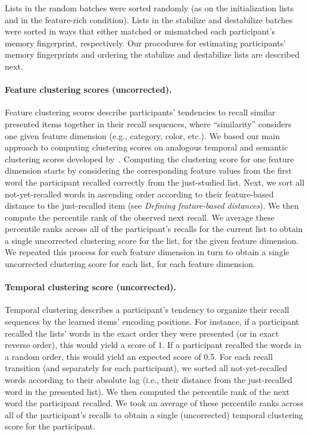 \documentclass[11pt]{article}
\begin{document}
Lists in the random batches were sorted randomly (as on the initialization
lists and in the feature-rich condition). Lists in the stabilize and
destabilize batches were sorted in ways that either matched or mismatched each
participant's memory fingerprint, respectively. Our procedures for estimating
participants' memory fingerprints and ordering the stabilize and destabilize
lists are described next.

\paragraph*{Feature clustering scores (uncorrected).}

Feature clustering scores describe participants' tendencies to recall similar
presented items together in their recall sequences, where ``similarity''
considers one given feature dimension (e.g., category, color, etc.). We based
our main approach to computing clustering scores on analogous temporal and
semantic clustering scores developed by~\cite{PolyEtal09}. Computing the
clustering score for one feature dimension starts by considering the
corresponding feature values from the first word the participant recalled
correctly from the just-studied list. Next, we sort all not-yet-recalled words
in ascending order according to their feature-based distance to the
just-recalled item (see \textit{Defining feature-based distances}). We then
compute the percentile rank of the observed next recall. We average these
percentile ranks across all of the participant’s recalls for the current list
to obtain a single uncorrected clustering score for the list, for the given
feature dimension. We repeated this process for each feature dimension in turn
to obtain a single uncorrected clustering score for each list, for each feature
dimension.

\paragraph*{Temporal clustering score (uncorrected).}

Temporal clustering describes a participant's tendency to organize their recall
sequences by the learned items' encoding positions. For instance, if a
participant recalled the lists' words in the exact order they were presented
(or in exact reverse order), this would yield a score of 1. If a participant
recalled the words in a random order, this would yield an expected score of
0.5. For each recall transition (and separately for each participant), we
sorted all not-yet-recalled words according to their absolute lag (i.e.,
their distance from the just-recalled word in the presented list). We then computed the percentile rank of the next
word the participant recalled. We took an average of these percentile ranks
across all of the participant’s recalls to obtain a single (uncorrected)
temporal clustering score for the participant.
\end{document}
